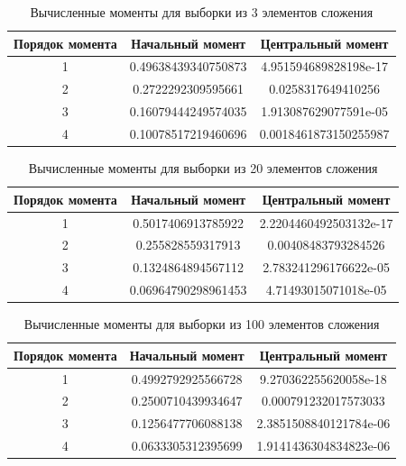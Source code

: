 \documentclass[a4paper,12pt]{article}
\begin{document}
\begin{table}[h]
	\caption{Вычисленные моменты для выборки из 3 элементов сложения}
	\begin{tabular}{|c|c|c|}
	\hline 
	Порядок момента & Начальный момент & Центральный момент \\ 
	\hline 
	1 & 0.49638439340750873 & 4.951594689828198e-17 \\ 
	\hline 
	2 & 0.2722292309595661 & 0.0258317649410256\\ 
	\hline 
	3 & 0.16079444249574035 &  1.913087629077591e-05 \\ 
	\hline 
	4 & 0.10078517219460696 & 0.0018461873150255987 \\ 
	\hline 
	\end{tabular} 

	\label{table:a_u_1}
\end{table}

\begin{table}[h]
	\caption{Вычисленные моменты для выборки из 20 элементов сложения}
	\begin{tabular}{|c|c|c|}
	\hline 
	Порядок момента & Начальный момент & Центральный момент \\ 
	\hline 
	1 & 0.5017406913785922 & 2.2204460492503132e-17 \\ 
	\hline 
	2 & 0.255828559317913 & 0.00408483793284526 \\ 
	\hline 
	3 & 0.1324864894567112 & 2.783241296176622e-05 \\ 
	\hline 
	4 & 0.06964790298961453 &  4.71493015071018e-05 \\ 
	\hline 
	\end{tabular} 

	\label{table:a_u_2}
\end{table}

\begin{table}[h]
	\caption{Вычисленные моменты для выборки из 100 элементов сложения}
	\begin{tabular}{|c|c|c|}
	\hline 
	Порядок момента & Начальный момент & Центральный момент \\ 
	\hline 
	1 & 0.4992792925566728 & 9.270362255620058e-18 \\ 
	\hline 
	2 & 0.2500710439934647 & 0.000791232017573033 \\ 
	\hline 
	3 & 0.1256477706088138 &  2.3851508840121784e-06 \\ 
	\hline 
	4 &  0.0633305312395699 & 1.9141436304834823e-06 \\ 
	\hline 
	\end{tabular} 
	
	\label{table:a_u_3}
\end{table}
\end{document}
